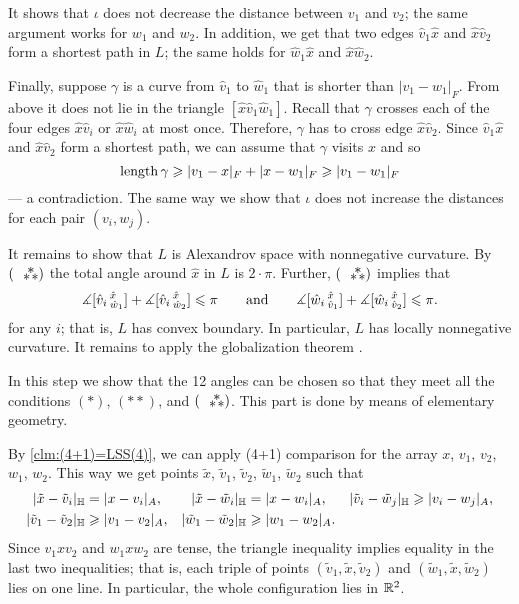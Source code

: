 \documentclass{article}
\begin{document}
It shows that $\iota$ does not decrease the distance between $v_1$ and $v_2$;
the same argument works for $w_1$ and $w_2$.
In addition, we get that two edges $\hat v_1\hat x$ and $\hat x\hat v_2$ form a shortest path in $L$; the same holds for $\hat w_1\hat x$ and $\hat x\hat w_2$.

Finally, suppose $\gamma$ is a curve from $\hat v_1$ to $\hat w_1$ that is shorter than $|v_1-w_1|_F$.
From above it does not lie in the triangle $[\hat x\hat v_1\hat w_1]$.
Recall that $\gamma$ crosses each of the four edges $\hat x \hat v_i$ or $\hat x \hat w_i$ at most once.
Therefore, $\gamma$ has to cross edge $\hat x \hat v_2$.
Since  $\hat v_1\hat x$ and $\hat x\hat v_2$ form a shortest path, we can assume that $\gamma$ visits $\hat x$ and so
\[\mathop{\rm length}\nolimits \gamma\geqslant |v_1-x|_F+|x-w_1|_F\geqslant |v_1-w_1|_F\]
--- a contradiction.
The same way we show that $\iota$ does not increase the distances for each pair $(v_i,w_j)$.

It remains to show that $L$ is  Alexandrov space with nonnegative curvature.
By $(\asterism)$ the total angle around $\hat x$ in $L$ is $2\cdot\pi$.
Further, $(\asterism)$ implies that
\[
\measuredangle [\hat v_i\,{}^{\hat x}_{\hat w_1}]
+\measuredangle [\hat v_i\,{}^{\hat x}_{\hat w_2}]
\leqslant \pi
\qquad\text{and}\qquad
\measuredangle [\hat w_i\,{}^{\hat x}_{\hat v_1}]
+\measuredangle [\hat w_i\,{}^{\hat x}_{\hat v_2}]
\leqslant \pi.
\]
for any $i$;
that is, $L$ has convex boundary.
In particular, $L$ has locally nonnegative curvature.
It remains to apply the globalization theorem \cite[8.32]{alexander2019alexandrov}. 

In this step we show that the 12 angles can be chosen so that they meet all the conditions $({*})$, $({*}{*})$, and $(\asterism)$.
This part is done by means of elementary geometry.

By \ref{clm:(4+1)=LSS(4)}, we can apply (4+1) comparison for the array $x$, $v_1$, $v_2$, $w_1$, $w_2$. This way we get points $\tilde x$, $\tilde v_1$, $\tilde v_2$, $\tilde w_1$, $\tilde w_2$ such that 
\begin{align*}
|\tilde x-\tilde v_i|_{\mathbb H}&=|x-v_i|_{A},
&
|\tilde x-\tilde w_i|_{\mathbb H}&=|x-w_i|_{A},
&
|\tilde v_i-\tilde w_j|_{\mathbb H}&\geqslant |v_i-w_j|_{A},
\\
|\tilde v_1-\tilde v_2|_{\mathbb H}&\geqslant |v_1-v_2|_{A},
&
|\tilde w_1-\tilde w_2|_{\mathbb H}&\geqslant |w_1-w_2|_{A}.
\end{align*}
Since $v_1xv_2$ and $w_1xw_2$ are tense,
the triangle inequality implies equality in the last two inequalities;
that is, each triple of points $(\tilde v_1,\tilde x,\tilde v_2)$ and $(\tilde w_1,\tilde x,\tilde w_2)$ lies on one line.
In particular, the whole configuration lies in $\mathbb{R}^2$.
\end{document}

